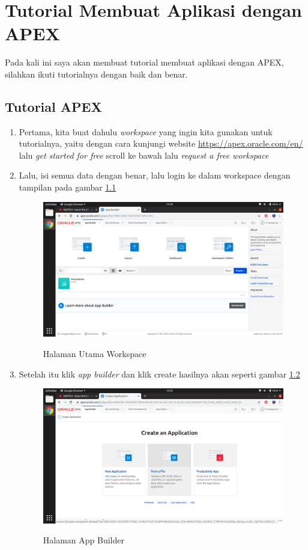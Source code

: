 \chapter{Tutorial Membuat Aplikasi dengan APEX}
Pada kali ini saya akan membuat tutorial membuat aplikasi dengan APEX, silahkan ikuti tutorialnya dengan baik dan benar.

\section{Tutorial APEX}

\begin{enumerate}
\item Pertama, kita buat dahulu \textit{workspace} yang ingin kita gunakan untuk tutorialnya, yaitu dengan cara kunjungi website \url{https://apex.oracle.com/en/} lalu \textit{get started for free} scroll ke bawah lalu \textit{request a free workspace}

\item Lalu, isi semua data dengan benar, lalu login ke dalam workspace dengan tampilan pada gambar \ref{1}
\begin{figure}[H]
\centering
\caption{Halaman Utama Workspace}
\includegraphics[width=1\textwidth]{figures/1}
\label{1}
\end{figure}

\item Setelah itu klik \textit{app builder} dan klik create hasilnya akan seperti gambar \ref{2}
\begin{figure}[H]
\centering
\caption{Halaman App Builder}
\includegraphics[width=1\textwidth]{figures/2}
\label{2}
\end{figure}


\end{enumerate}
